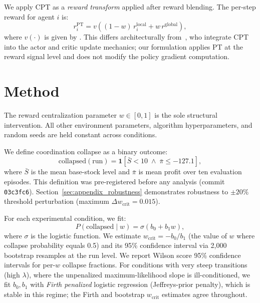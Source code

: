 \documentclass[letterpaper]{article}
\theoremstyle{plain}
\newcommand{\wcrit}{w_{\mathrm{crit}}}
\newcommand{\PT}{\mathrm{PT}}
\begin{document}
We apply CPT as a \emph{reward transform} applied after reward blending.
The per-step reward for agent $i$ is:
\begin{equation}
  r_i^{\PT} = v\!\left((1-w)\,r_i^{\mathrm{local}} + w\,r^{\mathrm{global}}\right),
  \label{eq:reward}
\end{equation}
where $v(\cdot)$ is given by .
This differs architecturally from~\citet{lalmohammed2025}, who integrate
CPT into the actor and critic update mechanics; our formulation applies PT
at the reward signal level and does not modify the policy gradient
computation.

\section{Method}
\label{sec:method}

The reward centralization parameter $w \in [0,1]$ is the sole structural
intervention.
All other environment parameters, algorithm hyperparameters, and random
seeds are held constant across conditions.

We define coordination collapse as a binary outcome:
\begin{equation}
  \mathrm{collapsed}(\text{run}) = \mathbf{1}\!\left[
    \bar{S} < 10 \;\wedge\; \bar{\pi} \leq -127.1
  \right],
  \label{eq:collapse}
\end{equation}
where $\bar{S}$ is the mean base-stock level and $\bar{\pi}$ is mean
profit over ten evaluation episodes.
This definition was pre-registered before any analysis (commit
\texttt{03c3fc6}).
Section~\ref{sec:appendix_robustness} demonstrates robustness to $\pm 20\%$
threshold perturbation (maximum $\Delta\wcrit = 0.015$).

For each experimental condition, we fit:
\begin{equation}
  P(\mathrm{collapsed} \mid w) = \sigma(b_0 + b_1 w),
  \label{eq:logistic}
\end{equation}
where $\sigma$ is the logistic function.
We estimate $\wcrit = -b_0/b_1$ (the value of $w$ where collapse
probability equals 0.5) and its 95\% confidence interval via 2,000
bootstrap resamples at the run level.
We report Wilson score 95\% confidence intervals for per-$w$ collapse
fractions. For conditions with very steep transitions (high $\lambda$), where the
unpenalized maximum-likelihood slope is ill-conditioned, we fit
$b_0,b_1$ with \emph{Firth penalized} logistic regression (Jeffreys-prior
penalty), which is stable in this regime; the Firth and bootstrap $\wcrit$
estimates agree throughout.
\end{document}
